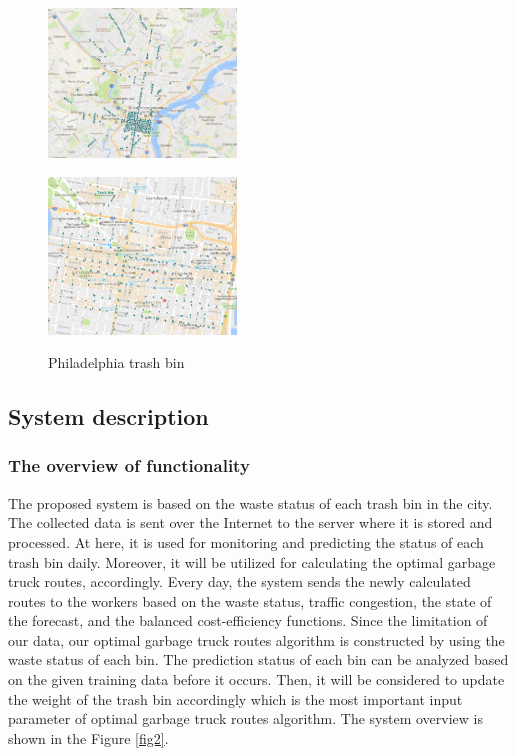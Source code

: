 \documentclass[conference,compsoc]{IEEEtran}
\begin{document}
\begin{figure}
	\centering
	\parbox{5cm}{
		\includegraphics[width=5cm]{overview1}
		\label{fig1a}}
	\qquad
	\begin{minipage}{5cm}
		\includegraphics[width=5cm]{overview3}
		\label{fig1b}
	\end{minipage}
	\caption{Philadelphia trash bin}
	\label{Philadelphia}
\end{figure}


\subsection{System description}
\label{systemdesciption}
\subsubsection{The overview of functionality}


The proposed system is based on the waste status of each trash bin in the city. The collected data is sent over the Internet to the server where it is stored and processed. At here, it is used for monitoring and predicting the status of each trash bin daily. Moreover, it will be utilized for calculating the optimal garbage truck routes, accordingly.  Every day, the system sends the newly calculated routes to the workers based on the waste status, traffic congestion, the state of the forecast, and the balanced cost-efficiency functions. Since the limitation of our data, our optimal garbage truck routes algorithm is constructed by using the waste status of each bin. The prediction status of each bin can be analyzed based on the given training data before it occurs. Then, it will be considered to update the weight of the trash bin accordingly which is the most important input parameter of optimal garbage truck routes algorithm. The system overview is shown in the Figure \ref{fig2}.
\end{document}
